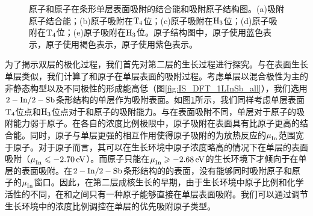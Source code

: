 \begin{figure}[htb]
{    }
    \caption{原子和原子在条形单层表面吸附的结合能和吸附原子结构图。(a)吸附原子结合能；(b)原子吸附在$\rm T_{4} \it$位；(c)原子吸附在$\rm H_{3} \it$位；(d)原子吸附在$\rm T_{4} \it$位；(e)原子吸附在$\rm H_{3} \it$位。原子结构图中，原子使用蓝色表示，原子使用褐色表示，原子使用紫色表示。}
    \label{fig:IS_2Linsb_adatom}
\end{figure}


为了揭示双层的极化过程，我们首先对第二层的生长过程进行探究。与在表面生长单层类似，我们计算了和原子在单层表面的吸附过程。考虑单层以混合极性为主的非静态构型以及不同极性的形成能高低（图\ref{fig:IS_DFT_1LInSb_all}），我们选用$\rm 2-In/2-Sb$条形结构的单层作为吸附表面。如图\ref{fig:IS_2Linsb_adatom}所示，我们同样考虑单层表面$\rm T_{4} \it$位点和$\rm H_{3} \it$位点对于和原子的吸附能力。与在表面吸附不同，单层对于原子的吸附能力弱于原子。在各自的浓度比例极限中，原子吸附在表面具有比原子更高的结合能。同时，原子与单层更强的相互作用使得原子吸附的为放热反应的$\it \mu_{\rm In}^{\rm } \it$范围宽于原子。对于原子而言，其可以在生长环境中原子浓度略高的情况下在单层的表面吸附（$\it \mu_{\rm In}^{\rm } \it\leqslant \SI{-2.70}{\electronvolt}$）。而原子只能在$\it \mu_{\rm In}^{\rm } \it \geqslant \SI{-2.68}{\electronvolt}$的生长环境下才倾向于在单层的表面吸附。在$\rm 2-In/2-Sb$条形结构的的表面，没有能够同时吸附原子和原子的$\it \mu_{\rm In}^{\rm } \it$窗口。因此，在第二层成核生长的早期，由于生长环境中原子比例和化学活性的不同，在和之间只有一种原子能够直接在单层表面吸附。我们可以通过调节生长环境中的浓度比例调控在单层的优先吸附原子类型。

